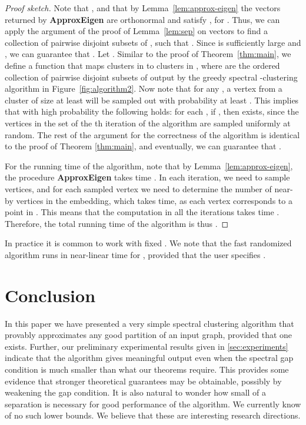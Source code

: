 \documentclass[11pt]{article}
\theoremstyle{plain}
\begin{document}
\begin{proof}[Proof sketch]
Note that , and
that by Lemma~\ref{lem:approx-eigen} the vectors  returned
by \textbf{ApproxEigen} are orthonormal and satisfy
, for . Thus, we can apply the argument of the proof of Lemma~\ref{lem:sep} on
vectors  to find a collection  of pairwise disjoint subsets of , such that
. Since  is sufficiently large
and , we can guarantee that . Let .
Similar to the proof of Theorem~\ref{thm:main}, we define a function
 that maps clusters in  to
clusters in , where  are the ordered
collection of pairwise disjoint subsets of  output by the greedy spectral
-clustering algorithm in Figure~\ref{fig:algorithm2}. Now note that for any
, a vertex from a cluster  of size at least  will be
sampled out with probability at least . This implies that with
high probability the following holds: for each , if , then  exists, since the vertices in the set 
of the th iteration of the algorithm are sampled uniformly at random. The
rest of the argument for the correctness of the algorithm is identical to the
proof of Theorem \ref{thm:main}, and eventually, we can guarantee that .

For the running time of the algorithm, note that by
Lemma~\ref{lem:approx-eigen}, the procedure \textbf{ApproxEigen} takes time
.
In each iteration, we need to sample  vertices, and for each sampled vertex we need to determine the number of near-by vertices in the embedding, which takes  time, as each vertex corresponds to a point in .
This means that the computation in all the  iterations
takes time . Therefore, the total running time of the
algorithm is thus .
\end{proof}

In practice it is common to work with fixed . We note that the fast
randomized algorithm runs in near-linear time for , provided
that the user specifies .

\section{Conclusion}
In this paper we have presented a very simple spectral clustering algorithm that provably approximates any good partition of an input graph, provided that one exists. Further, our preliminary experimental results given in \ref{sec:experiments} indicate that the algorithm gives meaningful output even when the  spectral gap condition is much smaller than what our theorems require.
This provides some evidence that stronger theoretical guarantees may be obtainable, possibly by weakening the gap condition. It is also natural to wonder how small of a separation is necessary for good performance of the algorithm. We currently know of no such lower bounds.
We believe that these are interesting research directions.
\end{document}
